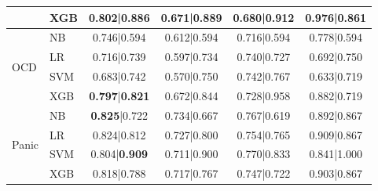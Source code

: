 \documentclass[letterpaper]{article} %
\begin{document}
\begin{table}[t]
\begin{tabular}{llcccc}
 & XGB & 0.802|\textbf{0.886} & 0.671|0.889 & 0.680|0.912 & 0.976|0.861 \\
\midrule
\multirow{4}{*}{OCD}
 & NB & 0.746|0.594 & 0.612|0.594 & 0.716|0.594 & 0.778|0.594 \\
 & LR & 0.716|0.739 & 0.597|0.734 & 0.740|0.727 & 0.692|0.750 \\
 & SVM & 0.683|0.742 & 0.570|0.750 & 0.742|0.767 & 0.633|0.719 \\
 & XGB & \textbf{0.797}|\textbf{0.821} & 0.672|0.844 & 0.728|0.958 & 0.882|0.719 \\
\midrule
\multirow{4}{*}{Panic}
 & NB & \textbf{0.825}|0.722 & 0.734|0.667 & 0.767|0.619 & 0.892|0.867 \\
 & LR & 0.824|0.812 & 0.727|0.800 & 0.754|0.765 & 0.909|0.867 \\
 & SVM & 0.804|\textbf{0.909} & 0.711|0.900 & 0.770|0.833 & 0.841|1.000 \\
 & XGB & 0.818|0.788 & 0.717|0.767 & 0.747|0.722 & 0.903|0.867 \\
\bottomrule
\end{tabular}
\end{table}
\end{document}
